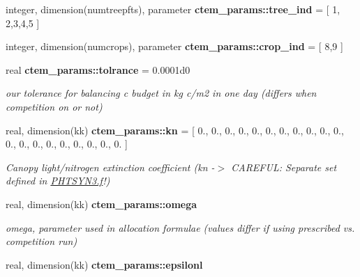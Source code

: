 \begin{DoxyCompactItemize}
\item 
\hypertarget{namespacectem__params_a0e1c44fcb6eedc488eba03f610e542dd}{}integer, dimension(numtreepfts), parameter {\bfseries ctem\+\_\+params\+::tree\+\_\+ind} = \mbox{[} 1, 2,3,4,5 \mbox{]}\label{namespacectem__params_a0e1c44fcb6eedc488eba03f610e542dd}

\item 
\hypertarget{namespacectem__params_acc6cbb656e34f04ef6d29df9e3418bb3}{}integer, dimension(numcrops), parameter {\bfseries ctem\+\_\+params\+::crop\+\_\+ind} = \mbox{[} 8,9 \mbox{]}\label{namespacectem__params_acc6cbb656e34f04ef6d29df9e3418bb3}

\item 
\hypertarget{namespacectem__params_a0556fbcb62b10a6e390157c628d227d1}{}real {\bfseries ctem\+\_\+params\+::tolrance} = 0.\+0001d0\label{namespacectem__params_a0556fbcb62b10a6e390157c628d227d1}

\begin{DoxyCompactList}\small\item\em our tolerance for balancing c budget in kg c/m2 in one day (differs when competition on or not) \end{DoxyCompactList}\item 
\hypertarget{namespacectem__params_a3a1fb11af516cf3daa780402bdbde953}{}real, dimension(kk) {\bfseries ctem\+\_\+params\+::kn} = \mbox{[} 0., 0., 0., 0., 0., 0., 0., 0., 0., 0., 0., 0., 0., 0., 0., 0., 0., 0., 0., 0. \mbox{]}\label{namespacectem__params_a3a1fb11af516cf3daa780402bdbde953}

\begin{DoxyCompactList}\small\item\em Canopy light/nitrogen extinction coefficient (kn -\/$>$ C\+A\+R\+E\+F\+U\+L\+: Separate set defined in \hyperlink{PHTSYN3_8f}{P\+H\+T\+S\+Y\+N3.\+f}!) \end{DoxyCompactList}\item 
\hypertarget{namespacectem__params_a632738827e870757c4538eb8abd3ba18}{}real, dimension(kk) {\bfseries ctem\+\_\+params\+::omega}\label{namespacectem__params_a632738827e870757c4538eb8abd3ba18}

\begin{DoxyCompactList}\small\item\em omega, parameter used in allocation formulae (values differ if using prescribed vs. competition run) \end{DoxyCompactList}\item 
\hypertarget{namespacectem__params_a555429920f02dff7239a96256af1a0eb}{}real, dimension(kk) {\bfseries ctem\+\_\+params\+::epsilonl}\label{namespacectem__params_a555429920f02dff7239a96256af1a0eb}


\end{DoxyCompactItemize}
